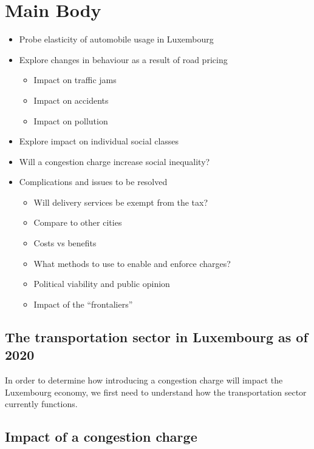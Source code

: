 \documentclass[
  a4paper,
  12pt,
]{article}
\providecommand{\tightlist}{
  \setlength{\itemsep}{0pt}
  \setlength{\parskip}{0pt}
}
\begin{document}
\hypertarget{main-body}{%
\section{Main Body}\label{main-body}}

\begin{itemize}
\tightlist
\item
  Probe elasticity of automobile usage in Luxembourg
\item
  Explore changes in behaviour as a result of road pricing

  \begin{itemize}
  \tightlist
  \item
    Impact on traffic jams
  \item
    Impact on accidents
  \item
    Impact on pollution
  \end{itemize}
\item
  Explore impact on individual social classes
\item
  Will a congestion charge increase social inequality?
\item
  Complications and issues to be resolved

  \begin{itemize}
  \tightlist
  \item
    Will delivery services be exempt from the tax?
  \item
    Compare to other cities
  \item
    Costs vs benefits
  \item
    What methods to use to enable and enforce charges?
  \item
    Political viability and public opinion
  \item
    Impact of the ``frontaliers''
  \end{itemize}
\end{itemize}

\hypertarget{the-transportation-sector-in-luxembourg-as-of-2020}{%
\subsection{The transportation sector in Luxembourg as of
2020}\label{the-transportation-sector-in-luxembourg-as-of-2020}}

In order to determine how introducing a congestion charge will impact
the Luxembourg economy, we first need to understand how the
transportation sector currently functions.

\hypertarget{impact-of-a-congestion-charge}{%
\subsection{Impact of a congestion
charge}\label{impact-of-a-congestion-charge}}
\end{document}
